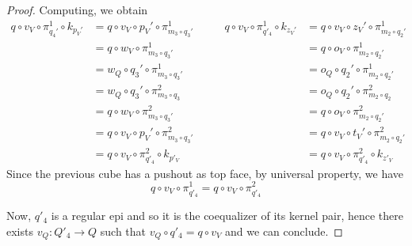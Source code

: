 \documentclass[a4paper,UKenglish,cleveref,pdftex,thm-restate,numberwithinsect]{lipics-v2021}
\begin{document}
\begin{proof}
Computing, we obtain
\[\begin{split}
	q \circ v_V \circ \pi_{q_4'}^1 \circ k_{p_V'} &= q \circ v_V \circ p_V' \circ \pi_{m_3 \circ q_3'}^1 \\
	&= q \circ w_V \circ \pi_{m_3 \circ q_3'}^1 \\
	&= w_Q \circ q_3' \circ \pi_{m_3 \circ q_3'}^1 \\
	&= w_Q \circ q_3' \circ \pi_{m_3 \circ q_3}^2 \\
	&= q \circ w_V \circ \pi_{m_3 \circ q_3'}^2 \\
	&= q \circ v_V \circ p_V' \circ \pi_{m_3 \circ q_3'}^2 \\
	&= q \circ v_V \circ \pi_{q'_4}^2 \circ k_{p'_V}
\end{split}\qquad\begin{split}
	q \circ v_V \circ \pi_{q'_4}^1 \circ k_{z_V'} &= q \circ v_V \circ z_V' \circ \pi_{m_2 \circ q_2'}^1 \\
	&= q \circ o_V \circ \pi_{m_2 \circ q_2'}^1 \\
	&= o_Q\circ q_2' \circ \pi_{m_2 \circ q_2'}^1 \\
	&= o_Q \circ q_2' \circ \pi_{m_2 \circ q_2}^2 \\
	&= q \circ o_V \circ \pi_{m_2 \circ q_2'}^2 \\
	&= q \circ v_V \circ t_V' \circ \pi_{m_2 \circ q_2'}^2 \\
	&= q \circ v_V \circ \pi_{q'_4}^2 \circ k_{z'_V}
\end{split}\]
Since the previous cube has a pushout as top face, by universal property, we have
\[
q \circ v_V \circ \pi_{q'_4}^1 = q \circ v_V \circ \pi_{q'_4}^2
\]

Now, $q'_4$ is a regular epi and so it is the coequalizer of its kernel pair, hence there exists $v_Q\colon Q'_4\to Q$ such that $v_Q\circ q'_4=q\circ v_V$ and we can conclude.
\end{proof}
\end{document}
